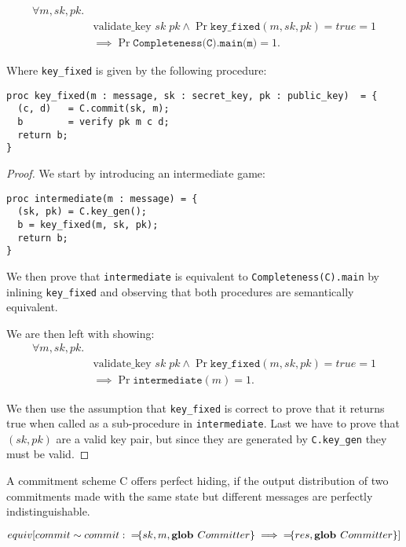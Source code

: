 \begin{lemma}
  \begin{align*}
    \forall m,sk,pk.& \\
    &\text{validate\_key } sk \; pk \land \Pr{\texttt{key\_{fixed}}(m, sk, pk) = true} = 1 \\
    & \implies \Pr{\texttt{Completeness(C).main(m)}} = 1.
  \end{align*}

  Where \texttt{key\_fixed} is given by the following procedure:

\begin{lstlisting}
proc key_fixed(m : message, sk : secret_key, pk : public_key)  = {
  (c, d)   = C.commit(sk, m);
  b        = verify pk m c d;
  return b;
}
\end{lstlisting}
\end{lemma}
\begin{proof}
  We start by introducing an intermediate game:
\begin{lstlisting}
proc intermediate(m : message) = {
  (sk, pk) = C.key_gen();
  b = key_fixed(m, sk, pk);
  return b;
}
\end{lstlisting}
  We then prove that \texttt{intermediate} is equivalent to
  \texttt{Completeness(C).main} by inlining \texttt{key\_fixed} and observing
  that both procedures are semantically equivalent.

  We are then left with showing:
  \begin{align*}
    \forall m,sk,pk.& \\
    &\text{validate\_key } sk \; pk \land \Pr{\texttt{key\_{fixed}}(m, sk, pk) = true} = 1 \\
    & \implies \Pr{\texttt{intermediate}(m)} = 1.
  \end{align*}

  We then use the assumption that \texttt{key\_fixed} is correct to prove that
  it returns true when called as a sub-procedure in \texttt{intermediate}. Last
  we have to prove that $(sk, pk)$ are a valid key pair, but since they are
  generated by \texttt{C.key\_gen} they must be valid.
\end{proof}

\begin{definition}
  \label{def:commitment:perfect-hiding}
  A commitment scheme C offers perfect hiding, if the output distribution of two
  commitments made with the same state but different messages are perfectly
  indistinguishable.

  \[
    equiv[commit \sim commit :\; {=}\!\{sk, m, \textbf{glob } Committer\} \implies {=}\!\{res, \textbf{glob } Committer\} ]
  \]

\end{definition}

